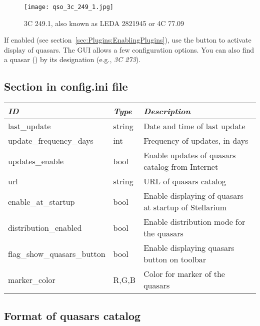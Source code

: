 \begin{figure}[ht]
\texttt{[image: qso\_3c\_249\_1.jpg]}
\label{fig:plugin:Quasars}
\caption{3C 249.1, also known as LEDA 2821945 or 4C 77.09}
\end{figure}




If enabled (see section~\ref{sec:Plugins:EnablingPlugins}), use the
 button to activate display of
quasars. The GUI allows a few configuration options.  You can also
find a quasar () by its designation (e.g., \emph{3C 273}).

\subsection{Section  in config.ini file}
\label{sec:plugins:Quasars:config}

\begin{longtabu} to \textwidth {l|l|X}\toprule
\emph{ID}               & \emph{Type} & \emph{Description}\\\midrule
last\_update                & string & Date and time of last update\\\midrule
update\_frequency\_days     & int    & Frequency of updates, in days\\\midrule
updates\_enable             & bool   & Enable updates of quasars catalog from Internet \\\midrule
url                         & string & URL of quasars catalog \\\midrule
enable\_at\_startup         & bool   & Enable displaying of quasars at startup of Stellarium \\\midrule
distribution\_enabled       & bool   & Enable distribution mode for the quasars \\\midrule
flag\_show\_quasars\_button & bool   & Enable displaying quasars button on toolbar \\\midrule
marker\_color               & R,G,B  & Color for marker of the quasars \\\bottomrule
\end{longtabu}

\newpage
\subsection{Format of quasars catalog}
\label{sec:plugins:Quasars:format}


